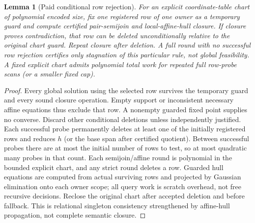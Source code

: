 \documentclass[11pt]{article}
\newtheorem{lemma}[theorem]{Lemma}
\begin{document}
\begin{lemma}[Paid conditional row rejection]\label{lem:dr18-probe}
For an explicit coordinate-table chart of polynomial encoded size, fix one registered row of one owner as a temporary guard and compute certified pair-semijoin and local-affine-hull closure. If closure proves contradiction, that row can be deleted unconditionally relative to the original chart guard. Repeat closure after deletion. A full round with no successful row rejection certifies only stagnation of this particular rule, not global feasibility. A fixed explicit chart admits polynomial total work for repeated full row-probe scans (or a smaller fixed cap).
\end{lemma}
\begin{proof}
Every global solution using the selected row survives the temporary guard and every sound closure operation. Empty support or inconsistent necessary affine equations thus exclude that row. A nonempty guarded fixed point supplies no converse. Discard other conditional deletions unless independently justified. Each successful probe permanently deletes at least one of the initially registered rows and reduces $h$ (or the base span after certified quotient). Between successful probes there are at most the initial number of rows to test, so at most quadratic many probes in that count. Each semijoin/affine round is polynomial in the bounded explicit chart, and any strict round deletes a row. Guarded hull equations are computed from actual surviving rows and projected by Gaussian elimination onto each owner scope; all query work is scratch overhead, not free recursive decisions. Reclose the original chart after accepted deletion and before fallback. This is relational singleton consistency strengthened by affine-hull propagation, not complete semantic closure.
\end{proof}
\end{document}
